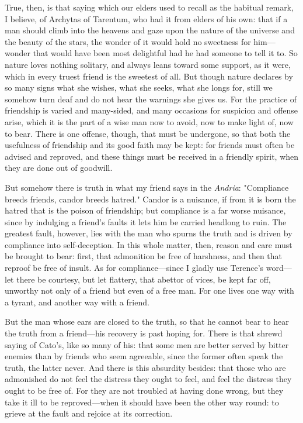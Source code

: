  True, then, is that saying which our elders used to recall as the habitual remark, I believe, of Archytas of Tarentum, who had it from elders of his own: that if a man should climb into the heavens and gaze upon the nature of the universe and the beauty of the stars, the wonder of it would hold no sweetness for him—wonder that would have been most delightful had he had someone to tell it to. So nature loves nothing solitary, and always leans toward some support, as it were, which in every truest friend is the sweetest of all. But though nature declares by so many signs what she wishes, what she seeks, what she longs for, still we somehow turn deaf and do not hear the warnings she gives us. For the practice of friendship is varied and many-sided, and many occasions for suspicion and offense arise, which it is the part of a wise man now to avoid, now to make light of, now to bear. There is one offense, though, that must be undergone, so that both the usefulness of friendship and its good faith may be kept: for friends must often be advised and reproved, and these things must be received in a friendly spirit, when they are done out of goodwill.

 But somehow there is truth in what my friend says in the \textit{Andria}: "Compliance breeds friends, candor breeds hatred." Candor is a nuisance, if from it is born the hatred that is the poison of friendship; but compliance is a far worse nuisance, since by indulging a friend's faults it lets him be carried headlong to ruin. The greatest fault, however, lies with the man who spurns the truth and is driven by compliance into self-deception. In this whole matter, then, reason and care must be brought to bear: first, that admonition be free of harshness, and then that reproof be free of insult. As for compliance—since I gladly use Terence's word—let there be courtesy, but let flattery, that abettor of vices, be kept far off, unworthy not only of a friend but even of a free man. For one lives one way with a tyrant, and another way with a friend.

 But the man whose ears are closed to the truth, so that he cannot bear to hear the truth from a friend—his recovery is past hoping for. There is that shrewd saying of Cato's, like so many of his: that some men are better served by bitter enemies than by friends who seem agreeable, since the former often speak the truth, the latter never. And there is this absurdity besides: that those who are admonished do not feel the distress they ought to feel, and feel the distress they ought to be free of. For they are not troubled at having done wrong, but they take it ill to be reproved—when it should have been the other way round: to grieve at the fault and rejoice at its correction.

